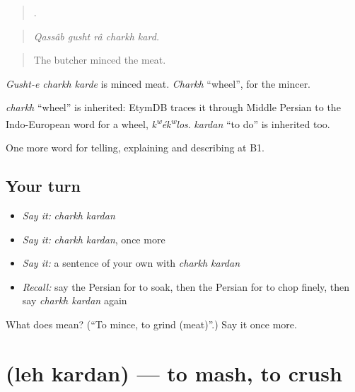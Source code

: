 \begin{quote}
    .
\end{quote}

\begin{quote}
\emph{Qassâb gusht râ charkh kard.}
\end{quote}

\begin{quote}
The butcher minced the meat.
\end{quote}

\emph{Gusht-e charkh karde} is minced meat. \emph{Charkh} \textquotedblleft{}wheel\textquotedblright{}, for the mincer.

\begin{cousinweb}
\emph{charkh} \textquotedblleft{}wheel\textquotedblright{} is inherited: EtymDB traces it through Middle Persian to the Indo-European word for a wheel, \emph{k\textsuperscript{w}ék\textsuperscript{w}los}. \emph{kardan} \textquotedblleft{}to do\textquotedblright{} is inherited too.
\end{cousinweb}

\begin{grammarlens}[title={What you've built}]
One more word for telling, explaining and describing at B1.
\end{grammarlens}

\subsection*{Your turn}
\begin{itemize}
\raggedright
  \item \emph{Say it:} \emph{charkh kardan}
  \item \emph{Say it:} \emph{charkh kardan}, once more
  \item \emph{Say it:} a sentence of your own with \emph{charkh kardan}
  \item \emph{Recall:} say the Persian for to soak, then the Persian for to chop finely, then say \emph{charkh kardan} again
\end{itemize}

\begin{tcolorbox}[breakable,colback=teal!4,colframe=teal!35!black,title={Before you move on}]
What does   mean? (\textquotedblleft{}To mince, to grind (meat)\textquotedblright{}.) Say it once more.
\end{tcolorbox}
\section[\texorpdfstring{\fa{له} \fa{کردن} (leh kardan)}{له کردن (leh kardan)}]{  (leh kardan) — to mash, to crush}

